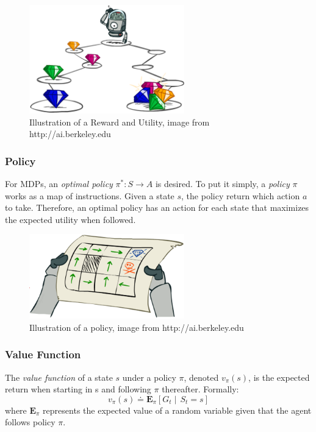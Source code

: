\begin{figure}[h]
	\centering
	\includegraphics[width=0.6\textwidth]{Cap3/Reward}
	\caption{Illustration of a Reward and Utility, image from http://ai.berkeley.edu}
	\label{Reward}
\end{figure}

\subsubsection{Policy}

For MDPs, an \textit{optimal policy} $\pi^*: S \to A $ is desired. To put it simply, a \textit{policy} $\pi$ works as a map of instructions. Given a state $s$, the policy return which action $a$ to take. Therefore, an optimal policy has an action for each state that maximizes the expected utility when followed.

\begin{figure}[h]
	\centering
	\includegraphics[width=0.6\textwidth]{Cap3/Policies}
	\caption{Illustration of a policy, image from http://ai.berkeley.edu}
	\label{Policies}
\end{figure}

\subsubsection{Value Function}
The \textit{value function} of a state $s$ under a policy $\pi$, denoted $v_{\pi}\left(s\right)$, is the expected return when starting in s and following $\pi$ thereafter. Formally:
\begin{equation} \label{ValueFunction}
v_{\pi}\left(s\right) \doteq \mathbf{E}_{\pi}\left[G_{t}\mid\,S_{t} = s\right]
\end{equation}
where $\mathbf{E}_{\pi}$ represents the expected value of a random variable given that the agent follows policy $\pi$.

